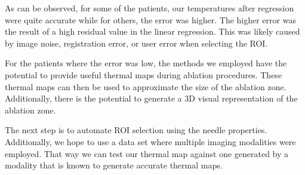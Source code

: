 \documentclass[]{spie}  %
\begin{document}
As can be observed, for some of the patients, our temperatures after regression were quite accurate while for others, the error was higher. The higher error was the result of a high residual value in the linear regression. This was likely caused by image noise, registration error, or user error when selecting the ROI. 

For the patients where the error was low, the methods we employed have the potential to provide useful thermal maps during ablation procedures. These thermal maps can then be used to approximate the size of the ablation zone. Additionally, there is the potential to generate a 3D visual representation of the ablation zone. 

The next step is to automate ROI selection using the needle properties. Additionally, we hope to use a data set where multiple imaging modalities were employed. That way we can test our thermal map against one generated by a modality that is known to generate accurate thermal maps. 



\end{document}
